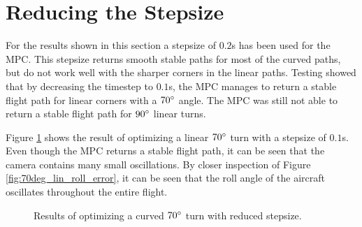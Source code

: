 \section{Reducing the Stepsize}
\label{sec:reducing_stepsize}

For the results shown in this section a stepsize of $0.2$s has been used for the MPC. This stepsize returns smooth stable paths for most of the curved paths, but do not work well with the sharper corners in the linear paths. Testing showed that by decreasing the timestep to $0.1$s, the MPC manages to return a stable flight path for linear corners with a $70\degree$ angle. The MPC was still not able to return a stable flight path for $90\degree$ linear turns.

Figure \ref{fig:70deg_lin_error} shows the result of optimizing a linear $70\degree$ turn with a stepsize of $0.1$s. Even though the MPC returns a stable flight path, it can be seen that the camera contains many small oscillations. By closer inspection of Figure \ref{fig:70deg_lin_roll_error}, it can be seen that the roll angle of the aircraft oscillates throughout the entire flight.

\begin{figure}
	\caption{Results of optimizing a curved $70\degree$ turn with reduced stepsize.}
	\label{fig:70deg_lin_error}
\end{figure}